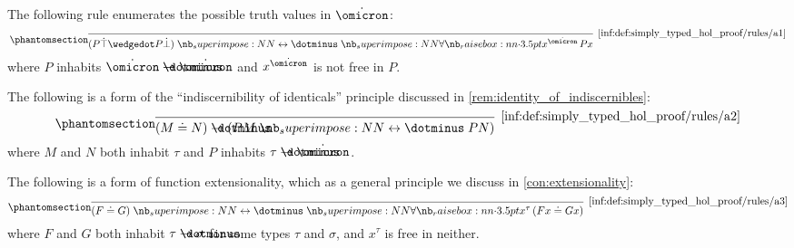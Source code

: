 \begin{definition}
\begin{thmenum}[series=def:simply_typed_hol_proof_tree]
    \begin{thmenum}
       The following rule enumerates the possible truth values in \( \syn\omicron \):
      \begin{equation*}\taglabel[\ensuremath{ \logic{A}_1 }]{inf:def:simply_typed_hol_proof/rules/a1}
        \begin{prooftree}
          \infer0[\ref{inf:def:simply_typed_hol_proof/rules/a1}]{ (P \syntop \synwedge P \synbot) \syniff \qforall {x^{\syn\omicron}} P x },
        \end{prooftree}
      \end{equation*}
      where \( P \) inhabits \( \syn\omicron \synimplies \syn\omicron \) and \( x^{\syn\omicron} \) is not free in \( P \).

       The following is a form of the \enquote{indiscernibility of identicals} principle discussed in \cref{rem:identity_of_indiscernibles}:
      \begin{equation*}\taglabel[\ensuremath{ \logic{A}_2 }]{inf:def:simply_typed_hol_proof/rules/a2}
        \begin{prooftree}
          \infer0[\ref{inf:def:simply_typed_hol_proof/rules/a2}]{ (M \syneq N) \synimplies (PM \syniff PN) },
        \end{prooftree}
      \end{equation*}
      where \( M \) and \( N \) both inhabit \( \tau \) and \( P \) inhabits \( \tau \synimplies \syn\omicron \).

       The following is a form of function extensionality, which as a general principle we discuss in \cref{con:extensionality}:
      \begin{equation*}\taglabel[\ensuremath{ \logic{A}_3 }]{inf:def:simply_typed_hol_proof/rules/a3}
        \begin{prooftree}
          \infer0[\ref{inf:def:simply_typed_hol_proof/rules/a3}]{ (F \syneq G) \syniff \qforall {x^\tau} (Fx \syneq Gx) },
        \end{prooftree}
      \end{equation*}
      where \( F \) and \( G \) both inhabit \( \tau \synimplies \sigma \) for some types \( \tau \) and \( \sigma \), and \( x^\tau \) is free in neither.


\end{thmenum}
\end{thmenum}
\end{definition}

